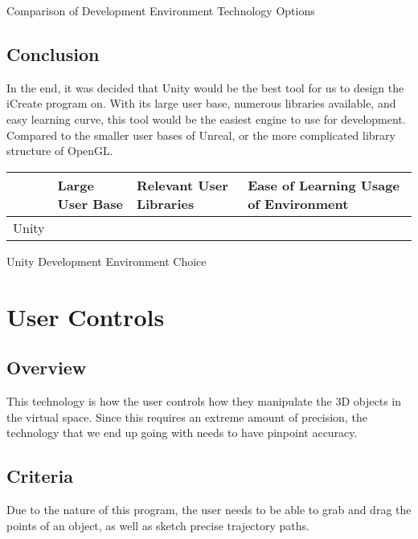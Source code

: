 \documentclass[letterpaper,10pt,onecolumn,compsoc]{IEEEtran}
\begin{document}
\begin{center}
Comparison of Development Environment Technology Options
\end{center}

\subsection{Conclusion}
In the end, it was decided that Unity would be the best tool for us to design the iCreate program on. With its large user base, numerous libraries available, and easy learning curve, this tool would be the easiest engine to use for development. Compared to the smaller user bases of Unreal, or the more complicated library structure of OpenGL.


\begin{center}
\begin{tabular}{ | P{3cm} | P{2.5cm} | P{3.5cm} | P{6cm} | } 
 	\hline
 	 & Large User Base & Relevant User Libraries & Ease of Learning Usage of Environment \\ 
 	\hline 		
 	Unity & \checkmark & \checkmark & \checkmark \\ 
 	\hline
\end{tabular}
\end{center}

\begin{center}
Unity Development Environment Choice
\end{center}

\newpage

\section{User Controls}

\subsection{Overview}
This technology is how the user controls how they manipulate the 3D objects in the virtual space. Since this requires an extreme amount of precision, the technology that we end up going with needs to have pinpoint accuracy.

\subsection{Criteria}
Due to the nature of this program, the user needs to be able to grab and drag the points of an object, as well as sketch precise trajectory paths.
\end{document}
